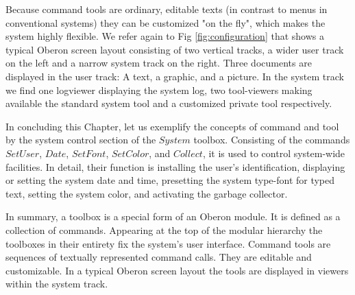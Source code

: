 Because command tools are ordinary, editable texts (in contrast to menus in conventional
systems) they can be customized "on the fly", which makes the system highly flexible. We refer
again to Fig \ref{fig:configuration} that shows a typical Oberon screen layout consisting of two vertical tracks, a
wider user track on the left and a narrow system track on the right. Three documents are
displayed in the user track: A text, a graphic, and a picture. In the system track we find one logviewer displaying the system log, two tool-viewers making available the standard system tool and
a customized private tool respectively.

In concluding this Chapter, let us exemplify the concepts of command and tool by the system control section of the $System$ toolbox. Consisting of the commands $SetUser$, $Date$, $SetFont$, $SetColor$, and $Collect$, it is used to control system-wide facilities. In detail, their function is installing the user's identification, displaying or setting the system date and time, presetting the system type-font for typed text, setting the system color, and activating the garbage collector.

In summary, a toolbox is a special form of an Oberon module. It is defined as a collection of commands. Appearing at the top of the modular hierarchy the toolboxes in their entirety fix the system’s user interface. Command tools are sequences of textually represented command calls. They are editable and customizable. In a typical Oberon screen layout the tools are displayed in viewers within the system track.
